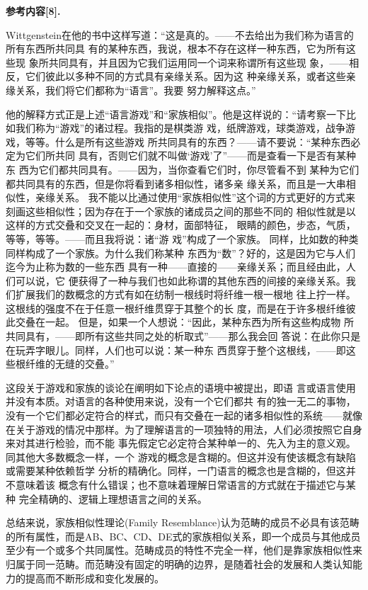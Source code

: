 \documentclass{article}
\begin{document}
\textbf{\kaishu 参考内容[8].}
{
Wittgenstein在他的书中这样写道：“这是真的。——不去给出为我们称为语言的所有东西所共同具 有的某种东西，我说，根本不存在这样一种东西，它为所有这些现 象所共同具有，并且因为它我们运用同一个词来称谓所有这些现 象，——相反，它们彼此以多种不同的方式具有亲缘关系。因为这 种亲缘关系，或者这些亲缘关系，我们将它们都称为“语言”。我要 努力解释这点。”

他的解释方式正是上述“语言游戏”和“家族相似”。他是这样说的：“请考察一下比如我们称为“游戏”的诸过程。我指的是棋类游 戏，纸牌游戏，球类游戏，战争游戏，等等。什么是所有这些游戏 所共同具有的东西？——请不要说：“某种东西必定为它们所共同 具有，否则它们就不叫做‘游戏’了”——而是查看一下是否有某种东 西为它们都共同具有。——因为，当你查看它们时，你尽管看不到 某种为它们都共同具有的东西，但是你将看到诸多相似性，诸多亲 缘关系，而且是一大串相似性，亲缘关系。 我不能以比通过使用“家族相似性”这个词的方式更好的方式来 刻画这些相似性；因为存在于一个家族的诸成员之间的那些不同的 相似性就是以这样的方式交叠和交叉在一起的：身材，面部特征， 眼睛的颜色，步态，气质，等等，等等。——而且我将说：诸“游 戏”构成了一个家族。 同样，比如数的种类同样构成了一个家族。为什么我们称某种 东西为“数”？好的，这是因为它与人们迄今为止称为数的一些东西 具有一种——直接的——亲缘关系；而且经由此，人们可以说，它 便获得了一种与我们也如此称谓的其他东西的间接的亲缘关系。我 们扩展我们的数概念的方式有如在纺制一根线时将纤维一根一根地 往上拧一样。这根线的强度不在于任意一根纤维贯穿于其整个的长 度，而是在于许多根纤维彼此交叠在一起。 但是，如果一个人想说：“因此，某种东西为所有这些构成物 所共同具有，——即所有这些共同之处的析取式”——那么我会回 答说：在此你只是在玩弄字眼儿。同样，人们也可以说：某一种东 西贯穿于整个这根线，——即这些根纤维的无缝的交叠。”

这段关于游戏和家族的谈论在阐明如下论点的语境中被提出，即语 言或语言使用并没有本质。对语言的各种使用来说，没有一个它们都共 有的独一无二的事物，没有一个它们都必定符合的样式，而只有交叠在一起的诸多相似性的系统——就像在关于游戏的情况中那样。为了理解语言的一项独特的用法，人们必须按照它自身来对其进行检验，而不能 事先假定它必定符合某种单一的、先入为主的意义观。同其他大多数概念一样，一个 游戏的概念是含糊的。但这并没有使该概念有缺陷或需要某种依赖哲学 分析的精确化。同样，一门语言的概念也是含糊的，但这并不意味着该 概念有什么错误；也不意味着理解日常语言的方式就在于描述它与某种 完全精确的、逻辑上理想语言之间的关系。

总结来说，家族相似性理论(Family Resemblance)认为范畴的成员不必具有该范畴的所有属性，而是AB、BC、CD、DE式的家族相似关系，即一个成员与其他成员至少有一个或多个共同属性。范畴成员的特性不完全一样，他们是靠家族相似性来归属于同一范畴。而范畴没有固定的明确的边界，是随着社会的发展和人类认知能力的提高而不断形成和变化发展的。}
\end{document}
